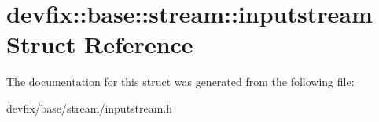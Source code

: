 \hypertarget{structdevfix_1_1base_1_1stream_1_1inputstream}{}\section{devfix\+:\+:base\+:\+:stream\+:\+:inputstream Struct Reference}
\label{structdevfix_1_1base_1_1stream_1_1inputstream}


The documentation for this struct was generated from the following file\+:\begin{DoxyCompactItemize}
\item 
devfix/base/stream/inputstream.\+h\end{DoxyCompactItemize}
